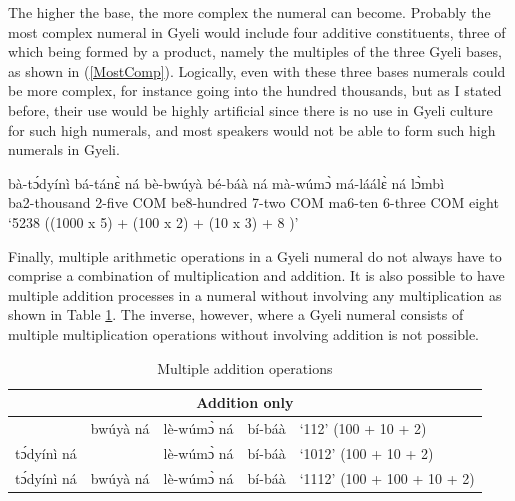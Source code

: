 \noindent The higher the base, the more complex the numeral can become. Probably the most complex numeral in Gyeli would include four additive constituents, three of which being formed by a product, namely the multiples of the three Gyeli bases, as shown in (\ref{MostComp}). Logically, even with these three bases numerals could be more complex, for instance going into the hundred thousands, but as I stated before, their use would be highly artificial since there is no use in Gyeli culture for such high numerals, and most speakers would not be able to form such high numerals in Gyeli.

\begin{exe}
\ex\label{MostComp}
  \gll   bà-tɔ́dyínì bá-tánɛ̀ ná bè-bwúyà bé-báà ná mà-wúmɔ̀ má-láálɛ̀ ná lɔ̀mbì  \\
                ba2-thousand 2-five COM be8-hundred 7-two COM ma6-ten 6-three COM eight \\
    \trans `5238 ((1000 x 5) + (100 x 2) + (10 x 3) + 8 )'
\end {exe}

\noindent Finally, multiple arithmetic operations in a Gyeli numeral do not always have to comprise a combination of multiplication and addition.  It is also possible to have multiple addition processes in a numeral without involving any multiplication as shown in Table \ref{tab:NumOrderAdd}. The inverse, however, where a Gyeli numeral consists of multiple multiplication operations without involving addition is not possible.

\begin{table} 
\centering
\begin{tabular}{llll|l}
 \midrule
\multicolumn{5}{c}{\bfseries Addition only} \\ 
  \midrule
& bwúyà ná &  lè-wúmɔ̀ ná &  bí-báà & `112' (100 + 10 + 2) \\
tɔ́dyínì ná & & lè-wúmɔ̀ ná &  bí-báà & `1012' (100 + 10 + 2) \\
tɔ́dyínì ná & bwúyà ná & lè-wúmɔ̀ ná &  bí-báà & `1112' (100 + 100 + 10 + 2) \\
  \midrule
\end{tabular}
\caption{Multiple addition operations}
\label{tab:NumOrderAdd}
\end{table}

